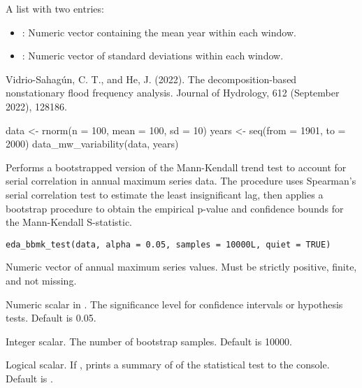 \documentclass[a4paper]{book}
\begin{document}
%
\begin{Value}
A list with two entries:
\begin{itemize}

\item{} : Numeric vector containing the mean year within each window.
\item{} : Numeric vector of standard deviations within each window.

\end{itemize}

\end{Value}
%
\begin{References}
Vidrio-Sahagún, C. T., and He, J. (2022). The decomposition-based nonstationary
flood frequency analysis. Journal of Hydrology, 612 (September 2022), 128186.
\end{References}
%
\begin{Examples}
\begin{ExampleCode}
data <- rnorm(n = 100, mean = 100, sd = 10)
years <- seq(from = 1901, to = 2000)
data_mw_variability(data, years)

\end{ExampleCode}
\end{Examples}
%
\begin{Description}
Performs a bootstrapped version of the Mann-Kendall trend test to account
for serial correlation in annual maximum series data. The procedure
uses Spearman’s serial correlation test to estimate the least insignificant lag,
then applies a bootstrap procedure to obtain the empirical p-value and confidence
bounds for the Mann-Kendall S-statistic.
\end{Description}
%
\begin{Usage}
\begin{verbatim}
eda_bbmk_test(data, alpha = 0.05, samples = 10000L, quiet = TRUE)
\end{verbatim}
\end{Usage}
%
\begin{Arguments}
\begin{ldescription}
\item[\code{data}] Numeric vector of annual maximum series values.
Must be strictly positive, finite, and not missing.

\item[\code{alpha}] Numeric scalar in \eqn{[0.01, 0.1]}{}. The significance
level for confidence intervals or hypothesis tests. Default is 0.05.

\item[\code{samples}] Integer scalar. The number of bootstrap samples. Default is 10000.

\item[\code{quiet}] Logical scalar. If , prints a summary of of the statistical
test to the console. Default is .
\end{ldescription}
\end{Arguments}
\end{document}
